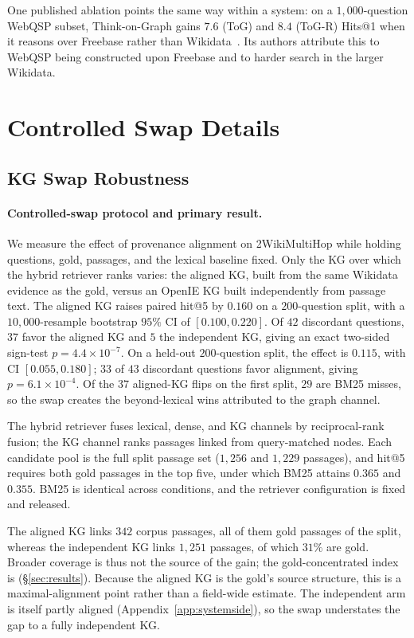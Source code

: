 \documentclass[11pt]{article}
\begin{document}
One published ablation points the same way within a system: on a $1{,}000$-question WebQSP subset, Think-on-Graph gains $7.6$ (ToG) and $8.4$ (ToG-R) Hits@1 when it reasons over Freebase rather than Wikidata~\citep{sun2024thinkongraph}. Its authors attribute this to WebQSP being constructed upon Freebase and to harder search in the larger Wikidata.

\FloatBarrier
\section{Controlled Swap Details}
\subsection{KG Swap Robustness}
\label{app:swaprobust}
\paragraph{Controlled-swap protocol and primary result.} We measure the effect of provenance alignment on 2WikiMultiHop while holding questions, gold, passages, and the lexical baseline fixed. Only the KG over which the hybrid retriever ranks varies: the aligned KG, built from the same Wikidata evidence as the gold, versus an OpenIE KG built independently from passage text. The aligned KG raises paired hit@5 by $0.160$ on a $200$-question split, with a $10{,}000$-resample bootstrap $95\%$ CI of $[0.100,0.220]$. Of $42$ discordant questions, $37$ favor the aligned KG and $5$ the independent KG, giving an exact two-sided sign-test $p=4.4\times10^{-7}$. On a held-out $200$-question split, the effect is $0.115$, with CI $[0.055,0.180]$; $33$ of $43$ discordant questions favor alignment, giving $p=6.1\times10^{-4}$. Of the $37$ aligned-KG flips on the first split, $29$ are BM25 misses, so the swap creates the beyond-lexical wins attributed to the graph channel.

The hybrid retriever fuses lexical, dense, and KG channels by reciprocal-rank fusion; the KG channel ranks passages linked from query-matched nodes. Each candidate pool is the full split passage set ($1{,}256$ and $1{,}229$ passages), and hit@5 requires both gold passages in the top five, under which BM25 attains $0.365$ and $0.355$. BM25 is identical across conditions, and the retriever configuration is fixed and released.

The aligned KG links $342$ corpus passages, all of them gold passages of the split, whereas the independent KG links $1{,}251$ passages, of which $31\%$ are gold. Broader coverage is thus not the source of the gain; the gold-concentrated index is (\S\ref{sec:results}). Because the aligned KG is the gold's source structure, this is a maximal-alignment point rather than a field-wide estimate. The independent arm is itself partly aligned (Appendix~\ref{app:systemside}), so the swap understates the gap to a fully independent KG.
\end{document}
